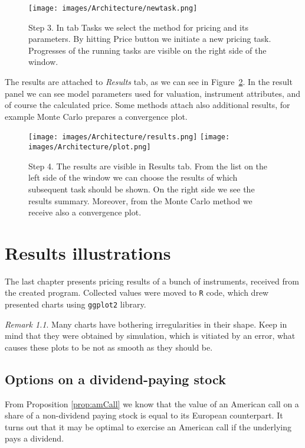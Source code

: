\documentclass[a4paper,11pt, twoside]{book}
\theoremstyle{definition}
\theoremstyle{remark}
\newtheorem{remark}{Remark}[chapter]
\newcounter{example}[chapter]
\begin{document}
\begin{figure}[!hb]
\centering
 \texttt{[image: images/Architecture/newtask.png]}
 \caption{Step 3. In tab {\upshape Tasks} we select the method for pricing and its parameters. By hitting {\upshape Price} button we initiate a new pricing task. Progresses of the running tasks are visible on the right side of the window.}
\label{fig:arch:newtask}
\end{figure}

The results are attached to \textit{Results} tab, as we can see in Figure~\ref{fig:arch:results}. In the result panel we can see model parameters used for valuation, instrument attributes, and of course the calculated price. Some methods attach also additional results, for example Monte Carlo prepares a convergence plot.

\begin{figure}[!ht]
\centering
 \texttt{[image: images/Architecture/results.png]}
 \texttt{[image: images/Architecture/plot.png]}
 \caption{Step 4. The results are visible in {\upshape Results} tab. From the list on the left side of the window we can choose the results of which subsequent task should be shown. On the right side we see the results summary. Moreover, from the Monte Carlo method we receive also a convergence plot.}
\label{fig:arch:results}
\end{figure}

\chapter{Results illustrations}
The last chapter presents pricing results of a bunch of instruments, received from the created program. Collected values were moved to \texttt{R} code, which drew presented charts using \texttt{ggplot2} library.

\begin{remark}
 Many charts have bothering irregularities in their shape. Keep in mind that they were obtained by simulation, which is vitiated by an error, what causes these plots to be not as smooth as they should be.
\end{remark}


\section{Options on a dividend-paying stock}
From Proposition \ref{prop:amCall} we know that the value of an American call on a share of a non-dividend paying stock is equal to its European counterpart. 
It turns out that it may be optimal to exercise an American call if the underlying pays a dividend.
\end{document}
